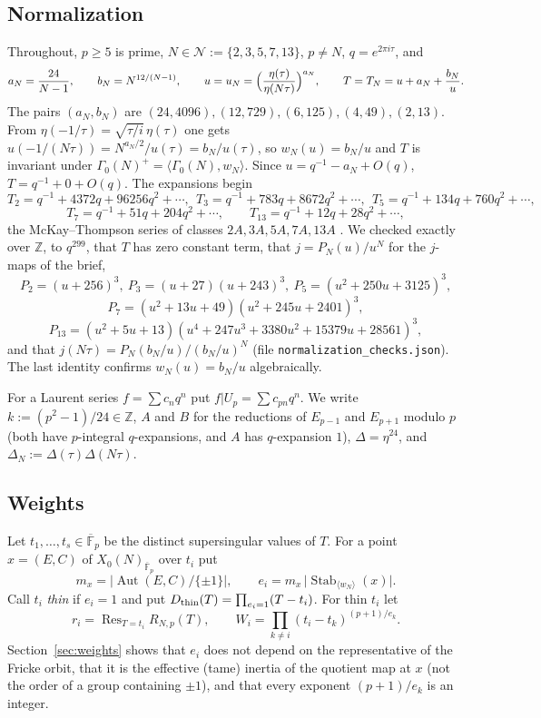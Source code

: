 \documentclass[11pt,a4paper]{article}
\numberwithin{equation}{section}
\theoremstyle{definition}
\theoremstyle{remark}
\newcommand{\Fb}{\overline{\mathbb F}_p}
\newcommand{\Z}{\mathbb Z}
\newcommand{\Res}{\operatorname{Res}}
\newcommand{\Aut}{\operatorname{Aut}}
\newcommand{\Stab}{\operatorname{Stab}}
\begin{document}
\subsection{Normalization}
Throughout, $p\ge5$ is prime, $N\in\mathcal N:=\{2,3,5,7,13\}$, $p\ne N$, $q=e^{2\pi i\tau}$, and
\[
a_N=\frac{24}{N-1},\qquad b_N=N^{12/(N-1)},\qquad u=u_N=\Bigl(\frac{\eta(\tau)}{\eta(N\tau)}\Bigr)^{a_N},\qquad
T=T_N=u+a_N+\frac{b_N}{u}.
\]
The pairs $(a_N,b_N)$ are $(24,4096),(12,729),(6,125),(4,49),(2,13)$. From
$\eta(-1/\tau)=\sqrt{\tau/i}\,\eta(\tau)$ one gets $u(-1/(N\tau))=N^{a_N/2}/u(\tau)=b_N/u(\tau)$, so
$w_N(u)=b_N/u$ and $T$ is invariant under $\Gamma_0(N)^+=\langle\Gamma_0(N),w_N\rangle$.
Since $u=q^{-1}-a_N+O(q)$, $T=q^{-1}+0+O(q)$. The expansions begin
\[
T_2=q^{-1}+4372q+96256q^2+\cdots,\ \ T_3=q^{-1}+783q+8672q^2+\cdots,\ \
T_5=q^{-1}+134q+760q^2+\cdots,
\]
\[
T_7=q^{-1}+51q+204q^2+\cdots,\qquad T_{13}=q^{-1}+12q+28q^2+\cdots,
\]
the McKay--Thompson series of classes $2A,3A,5A,7A,13A$ \citep{CN79}. We checked exactly over
$\Z$, to $q^{299}$, that $T$ has zero constant term, that $j=P_N(u)/u^N$ for the $j$-maps
of the brief,
\[
P_2=(u+256)^3,\ P_3=(u+27)(u+243)^3,\ P_5=(u^2+250u+3125)^3,
\]
\[
P_7=(u^2+13u+49)(u^2+245u+2401)^3,
\]
\[
P_{13}=(u^2+5u+13)(u^4+247u^3+3380u^2+15379u+28561)^3,
\]
and that $j(N\tau)=P_N(b_N/u)/(b_N/u)^N$ (file \texttt{normalization\_checks.json}). The last
identity confirms $w_N(u)=b_N/u$ algebraically.

For a Laurent series $f=\sum c_nq^n$ put $f|U_p=\sum c_{pn}q^n$. We write
$k:=(p^2-1)/24\in\Z$, $A$ and $B$ for the reductions of $E_{p-1}$ and $E_{p+1}$ modulo $p$
(both have $p$-integral $q$-expansions, and $A$ has $q$-expansion $1$), $\Delta=\eta^{24}$, and
$\Delta_N:=\Delta(\tau)\Delta(N\tau)$.

\subsection{Weights}
Let $t_1,\dots,t_s\in\Fb$ be the distinct supersingular values of $T$. For a point
$x=(E,C)$ of $X_0(N)_{\Fb}$ over $t_i$ put
\[
m_x=\bigl|\Aut(E,C)/\{\pm1\}\bigr|,\qquad e_i=m_x\,\bigl|\Stab_{\langle w_N\rangle}(x)\bigr|.
\]
Call $t_i$ \emph{thin} if $e_i=1$ and put $D_{\rm thin}(T)=\prod_{e_i=1}(T-t_i)$. For thin $t_i$ let
\[
r_i=\Res_{T=t_i}R_{N,p}(T),\qquad W_i=\prod_{k\ne i}(t_i-t_k)^{(p+1)/e_k}.
\]
Section~\ref{sec:weights} shows that $e_i$ does not depend on the representative of the Fricke
orbit, that it is the effective (tame) inertia of the quotient map at $x$ (not the order of a group
containing $\pm1$), and that every exponent $(p+1)/e_k$ is an integer.
\end{document}
